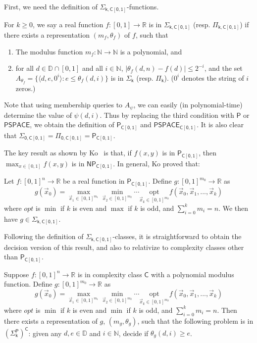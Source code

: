 \documentclass[prodmode]{acmsmall} %
\begin{document}
First, we need the definition of $\mathsf{\Sigma_{k,C[0,1]}}$-functions. 
\begin{definition}
For $k\geq 0$, we say a real function $f:[0,1]\rightarrow \mathbb{R}$ is in $\mathsf{\Sigma_{k,C[0,1]}}$ (resp. $\mathsf{\Pi_{k,C[0,1]}}$) if there exists a representation $(m_f, \theta_f)$ of $f$, such that
\begin{enumerate}
\item The modulus function $m_f: \mathbb{N}\rightarrow \mathbb{N}$ is a polynomial, and
\item for all $d\in \mathbb{D}\cap [0,1]$ and all $i\in \mathbb{N}$, $|\theta_f(d, n)-f(d)|\leq 2^{-i}$, and the set $A_{\theta_f} = \{\langle d, e, 0^i\rangle: e\leq \theta_f(d, i)\}$ is in $\mathsf{\Sigma_k}$ (resp. $\mathsf{\Pi_k}$). ($0^i$ denotes the string of $i$ zeros.) 
\end{enumerate}
\end{definition}
\begin{remark}
Note that using membership queries to $A_{\psi}$, we can easily (in polynomial-time) determine the value of $\psi(d,i)$. Thus by replacing the third condition with $\mathsf{P}$ or $\mathsf{PSPACE}$, we obtain the definition of $\mathsf{P_{C[0,1]}}$ and $\mathsf{PSPACE_{C[0,1]}}$. It is also clear that $\mathsf{\Sigma_{0,C[0,1]}}=\mathsf{\Pi_{0,C[0,1]}}=\mathsf{P_{C[0,1]}}$.  
\end{remark}
The key result as shown by Ko~\cite{Kobook} is that, if $f(x,y)$ is in $\mathsf{P_{C[0,1]}}$, then $\max_{x\in [0,1]} f(x,y)$ is in $\mathsf{NP_{C[0,1]}}$. In general, Ko proved that: 
\begin{proposition}
Let $f: [0,1]^n\rightarrow \mathbb{R}$ be a real function in $\mathsf{P_{C[0,1]}}$. Define $g: [0,1]^{m_0}\rightarrow \mathbb{R}$ as 
$$g(\vec x_0) = \max_{\vec x_1\in [0,1]^{m_1}}\min_{\vec x_2\in [0,1]^{m_2}}\cdots \underset{\vec x_k\in [0,1]^{m_k}}{\mbox{opt}} f(\vec x_0, \vec x_1, ..., \vec x_k)$$
where $opt$ is $\min$ if $k$ is even and $\max$ if $k$ is odd, and $\sum_{i=0}^k m_i = n$. We then have $g\in \mathsf{\Sigma_{k,C[0,1]}}$. 
\end{proposition}
Following the definition of $\mathsf{\Sigma_{k,C[0,1]}}$-classes, it is straightforward to obtain the decision version of this result, and also to relativize to complexity classes other than $\mathsf{P_{C[0,1]}}$. 
\begin{lemma}\label{lem}
Suppose $f: [0,1]^n\rightarrow\mathbb{R}$ is in complexity class $\mathsf{C}$ with a polynomial modulus function. Define $g: [0,1]^{m_0}\rightarrow \mathbb{R}$ as 
$$g(\vec x_0) = \max_{\vec x_1\in [0,1]^{m_1}}\min_{\vec x_2\in [0,1]^{m_2}}\cdots\underset{\vec x_k\in [0,1]^{m_k}}{\mbox{opt}}f(\vec x_0, \vec x_1, ..., \vec x_k)$$
where $opt$ is $\min$ if $k$ is even and $\min$ if $k$ is odd, and $\sum_{i=0}^k m_i = n$. Then there exists a representation of $g$, $(m_g, \theta_g)$, such that the following problem is in $\mathsf{(\Sigma_k^P)^C}$: given any $d,e\in \mathbb{D}$ and $i\in \mathbb{N}$, decide if $\theta_g(d, i)\geq e$. 
\end{lemma}
\end{document}
